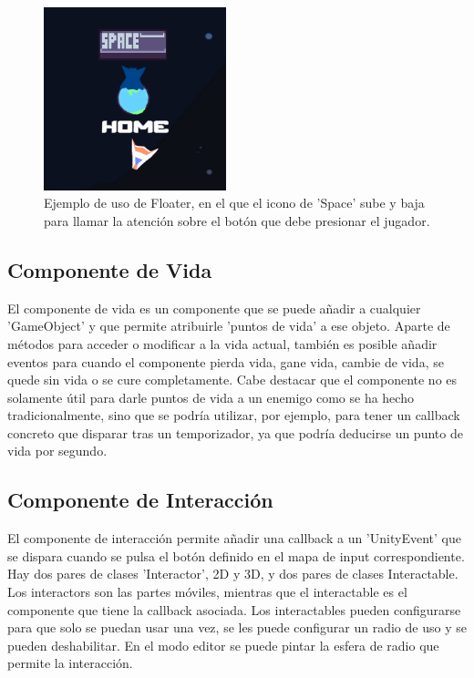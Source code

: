 \begin{figure}[H]
  \centering
    \includegraphics[width=200px,clip=true]{floaterExample.png}
  \caption{Ejemplo de uso de Floater, en el que el icono de 'Space' sube y baja para llamar la atención sobre el botón que debe presionar el jugador.}
  \label{fig:floaterExample}
\end{figure}


\subsection{Componente de Vida}
El componente de vida es un componente que se puede añadir a cualquier 'GameObject' y que permite atribuirle 'puntos de vida' a ese objeto. Aparte de métodos para acceder 
o modificar a la vida actual, también es posible añadir eventos para cuando el componente pierda vida, gane vida, cambie de vida, se quede sin vida o se cure completamente. 
Cabe destacar que el componente no es solamente útil para darle puntos de vida a un enemigo como se ha hecho tradicionalmente, sino que se podría utilizar, por ejemplo, 
para tener un callback concreto que disparar tras un temporizador, ya que podría deducirse un punto de vida por segundo.


\subsection{Componente de Interacción}
El componente de interacción permite añadir una callback a un 'UnityEvent' que se dispara cuando se pulsa el botón definido en el mapa de input correspondiente. 
Hay dos pares de clases 'Interactor', 2D y 3D, y dos pares de clases Interactable. Los interactors son las partes móviles, mientras que el interactable es el componente que 
tiene la callback asociada. Los interactables pueden configurarse para que solo se puedan usar una vez, se les puede configurar un radio de uso y se pueden deshabilitar. 
En el modo editor se puede pintar la esfera de radio que permite la interacción.

